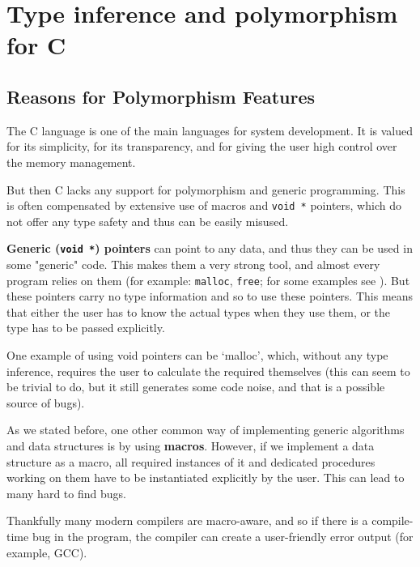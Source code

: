 \chapter{Type inference and polymorphism for C}
\label{chap:infPolyC}

\section{Reasons for Polymorphism Features}

The C language is one of the main languages for system development. It is valued for its simplicity, for its transparency, and for giving the user high control over the memory management.

But then C lacks any support for polymorphism and generic programming. This is often compensated by extensive use of macros and \lstinline{void *} pointers, which do not offer any type safety and thus can be easily misused.

\textbf{Generic (\lstinline{void *}) pointers} can point to any data, and thus they can be used in some "generic" code. This makes them a very strong tool, and almost every program relies on them (for example: \lstinline{malloc}, \lstinline{free}; for some examples see \cite{organisation1999iso}). But these pointers carry no type information and so to use these pointers. This means that either the user has to know the actual types when they use them, or the type has to be passed explicitly.

One example of using void pointers can be `malloc', which, without any type inference, requires the user to calculate the required themselves (this can seem to be trivial to do, but it still generates some code noise, and that is a possible source of bugs).

As we stated before, one other common way of implementing generic algorithms and data structures is by using \textbf{macros}. However, if we implement a data structure as a macro, all required instances of it and dedicated procedures working on them have to be instantiated explicitly by the user. This can lead to many hard to find bugs.

Thankfully many modern compilers are macro-aware, and so if there is a compile-time bug in the program, the compiler can create a user-friendly error output (for example, GCC). %


